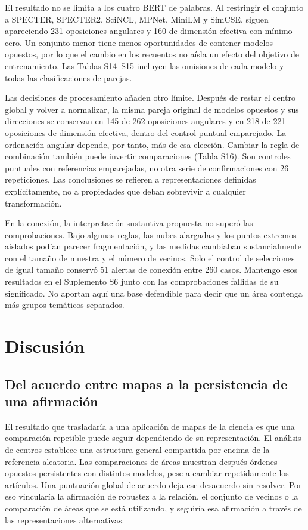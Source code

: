 \documentclass[12pt]{article}
\begin{document}
El resultado no se limita a los cuatro BERT de palabras. Al restringir el conjunto a SPECTER, SPECTER2, SciNCL, MPNet, MiniLM y SimCSE, siguen apareciendo 231 oposiciones angulares y 160 de dimensión efectiva con mínimo cero. Un conjunto menor tiene menos oportunidades de contener modelos opuestos, por lo que el cambio en los recuentos no aísla un efecto del objetivo de entrenamiento. Las Tablas S14--S15 incluyen las omisiones de cada modelo y todas las clasificaciones de parejas.

Las decisiones de procesamiento añaden otro límite. Después de restar el centro global y volver a normalizar, la misma pareja original de modelos opuestos y sus direcciones se conservan en 145 de 262 oposiciones angulares y en 218 de 221 oposiciones de dimensión efectiva, dentro del control puntual emparejado. La ordenación angular depende, por tanto, más de esa elección. Cambiar la regla de combinación también puede invertir comparaciones (Tabla S16). Son controles puntuales con referencias emparejadas, no otra serie de confirmaciones con 26 repeticiones. Las conclusiones se refieren a representaciones definidas explícitamente, no a propiedades que deban sobrevivir a cualquier transformación.

En la conexión, la interpretación sustantiva propuesta no superó las comprobaciones. Bajo algunas reglas, las nubes alargadas y los puntos extremos aislados podían parecer fragmentación, y las medidas cambiaban sustancialmente con el tamaño de muestra y el número de vecinos. Solo el control de selecciones de igual tamaño conservó 51 alertas de conexión entre 260 casos. Mantengo esos resultados en el Suplemento S6 junto con las comprobaciones fallidas de su significado. No aportan aquí una base defendible para decir que un área contenga más grupos temáticos separados.

\section{Discusión}
\subsection{Del acuerdo entre mapas a la persistencia de una afirmación}
El resultado que trasladaría a una aplicación de mapas de la ciencia es que una comparación repetible puede seguir dependiendo de su representación. El análisis de centros establece una estructura general compartida por encima de la referencia aleatoria. Las comparaciones de áreas muestran después órdenes opuestos persistentes con distintos modelos, pese a cambiar repetidamente los artículos. Una puntuación global de acuerdo deja ese desacuerdo sin resolver. Por eso vincularía la afirmación de robustez a la relación, el conjunto de vecinos o la comparación de áreas que se está utilizando, y seguiría esa afirmación a través de las representaciones alternativas.
\end{document}
